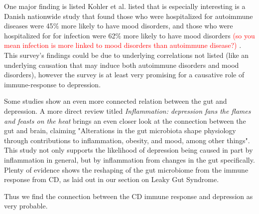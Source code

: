 \documentclass{article}
\begin{document}
One major finding is listed Kohler et al. listed that is especially interesting is a Danish nationwide study that found those who were hospitalized for autoimmune diseases were 45$\%$ more likely to have mood disorders, and  those who were hospitalized for for infection were 62$\%$ more likely to have mood disorders \textcolor{red}{(so you mean infection is more linked to mood disorders than autoimmune disease?)} \cite{Benros}. This survey's findings could be due to underlying correlations not listed (like an underlying causation that may induce both autoimmune disorders and mood disorders), however the survey is at least very promising for a causative role of immune-response to depression. 

Some studies show an even more connected relation between the gut and depression. A more direct review titled \textit{Inflammation: depression fans the flames and feasts on the heat} brings an even closer look at the connection between the gut and brain, claiming "Alterations in the gut microbiota shape physiology through contributions to inflammation, obesity, and mood, among other things"\cite{Kiecold-Glaser}. This study not only supports the likelihood of depression being caused in part by inflammation in general, but by inflammation from changes in the gut specifically. Plenty of evidence shows the reshaping of the gut microbiome from the immune response from CD, as laid out in our section on Leaky Gut Syndrome. 

Thus we find the connection between the CD immune response and depression as very probable. 

\end{document}
